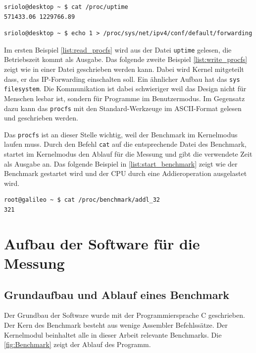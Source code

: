 \lstset{language=bash}
\begin{lstlisting}[label={list:read_procfs},caption={Lesen im procfs}]
sriolo@desktop ~ $ cat /proc/uptime 
571433.06 1229766.89
\end{lstlisting}
\begin{lstlisting}[label={list:write_procfs},caption={Schreiben im procfs}]
sriolo@desktop ~ $ echo 1 > /proc/sys/net/ipv4/conf/default/forwarding
\end{lstlisting}

Im ersten Beispiel \autoref{list:read_procfs} wird aus der Datei \texttt{uptime} gelesen, die Betriebszeit kommt als Ausgabe. Das folgende zweite Beispiel \autoref{list:write_procfs} zeigt wie in einer Datei geschrieben werden kann. Dabei wird Kernel mitgeteilt dass, er das IP-Forwarding einschalten soll. Ein ähnlicher Aufbau hat das \texttt{sys filesystem}. Die Kommunikation ist dabei schwieriger weil das Design nicht für Menschen lesbar ist, sondern für Programme im Benutzermodus. Im Gegensatz dazu kann das \texttt{procfs} mit den Standard-Werkzeuge im ASCII-Format gelesen und geschrieben werden.
\par
Das \texttt{procfs} ist an dieser Stelle wichtig, weil der Benchmark im Kernelmodus laufen muss. Durch den Befehl \texttt{cat} auf die entsprechende Datei des Benchmark, startet im Kernelmodus den Ablauf für die Messung und gibt die verwendete Zeit als Ausgabe an. Das folgende Beispiel in \autoref{list:start_benchmark} zeigt wie der Benchmark gestartet wird und der CPU durch eine Addieroperation ausgelastet wird.

\begin{lstlisting}[label={list:start_benchmark},caption={Starten des Benchmark}]
root@galileo ~ $ cat /proc/benchmark/addl_32
321
\end{lstlisting}


\section{Aufbau der Software für die Messung}


\subsection{Grundaufbau und Ablauf eines Benchmark}
Der Grundbau der Software wurde mit der Programmiersprache C geschrieben. Der Kern des Benchmark besteht aus wenige Assembler Befehlssätze. Der Kernelmodul beinhaltet alle in dieser Arbeit relevante Benchmarks. Die \autoref{fig:Benchmark} zeigt der Ablauf des Programm.

